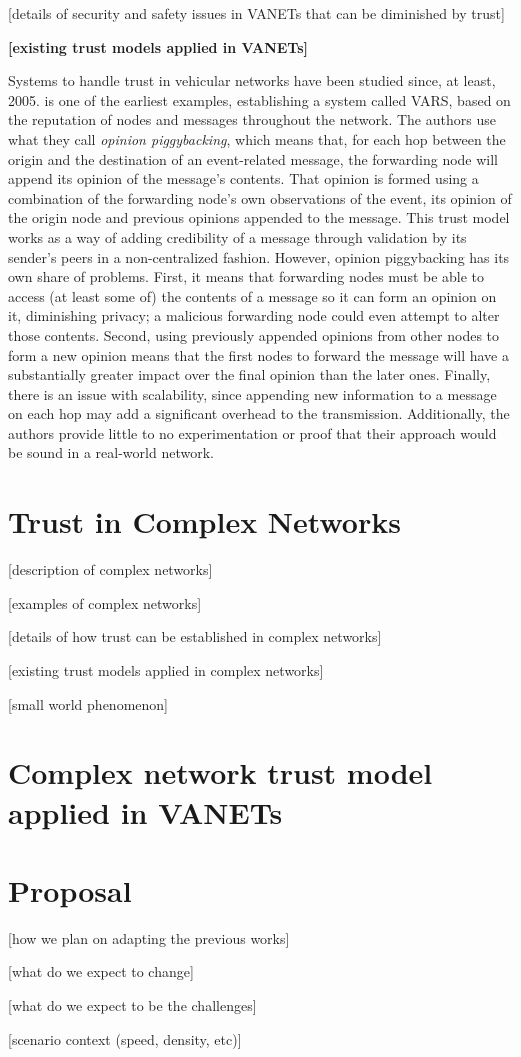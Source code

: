 \documentclass{article}
\begin{document}
[details of security and safety issues in VANETs that can be diminished by trust]

\textbf{[existing trust models applied in VANETs]}

Systems to handle trust in vehicular networks have been studied since, at least, 2005.
\cite{dotzer2005vars} is one of the earliest examples, establishing a system called VARS, based on the reputation of nodes and messages throughout the network. The authors use what they call \textit{opinion piggybacking}, which means that, for each hop between the origin and the destination of an event-related message, the forwarding node will append its opinion of the message's contents. That opinion is formed using a combination of the forwarding node's own observations of the event, its opinion of the origin node and previous opinions appended to the message. This trust model works as a way of adding credibility of a message through validation by its sender's peers in a non-centralized fashion. However, opinion piggybacking has its own share of problems. First, it means that forwarding nodes must be able to access (at least some of) the contents of a message so it can form an opinion on it, diminishing privacy; a malicious forwarding node could even attempt to alter those contents. Second, using previously appended opinions from other nodes to form a new opinion means that the first nodes to forward the message will have a substantially greater impact over the final opinion than the later ones. Finally, there is an issue with scalability, since appending new information to a message on each hop may add a significant overhead to the transmission. Additionally, the authors provide little to no experimentation or proof that their approach would be sound in a real-world network.

\section{Trust in Complex Networks}
[description of complex networks]

[examples of complex networks]

[details of how trust can be established in complex networks]

[existing trust models applied in complex networks]

[small world phenomenon]

\textbf{\cite{vernize2015malicious}}

\section{Complex network trust model applied in VANETs}


\section{Proposal}

[how we plan on adapting the previous works]

[what do we expect to change]

[what do we expect to be the challenges]

[scenario context (speed, density, etc)]




 
\end{document}
